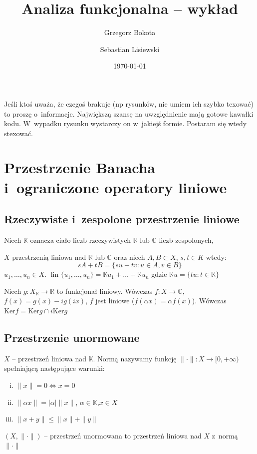 \documentclass[11pt]{mwrep}
\title{Analiza funkcjonalna  -- wykład}
\author{Grzegorz Bokota \and \normalsize  Sebastian Lisiewski}
\date{\today}
\renewcommand{\[}{\begin{equation}}
\renewcommand{\]}{\end{equation}}
\newcommand{\C}{{\ensuremath{\mathbb C}}}
\newcommand{\R}{{\ensuremath{\mathbb R}}}
\newcommand{\K}{\ensuremath{\mathbb{K}}}
\newcommand{\lin}{\operatorname{lin}}
\newcounter{numer}
\begin{document}
\setlength{\headheight}{15pt}
\pagestyle{fancy}
\maketitle
\tableofcontents
{}
Jeśli ktoś uważa, że czegoś brakuje (np rysunków, nie umiem ich szybko texować) to proszę o~informacje. 
Największą szansę na uwzględnienie mają gotowe kawałki kodu. W~wypadku rysunku wystarczy on w~jakiejś formie. Postaram się wtedy stexować.
\chapter{Przestrzenie Banacha i~ograniczone operatory liniowe}
\section{Rzeczywiste i~zespolone przestrzenie liniowe}
Niech $\K$ oznacza ciało liczb rzeczywistych $\R$ lub $\C$ liczb zespolonych,\par
$X$ przestrzenią liniowa nad $\R$ lub $\C$ oraz niech $A,B \subset  X$, $s,t \in K$ wtedy:
$$sA+tB = \{su + tv: u \in A, v\in B\}$$
$u_1,\ldots ,u_n \in X $. $\lin\{u_1,\ldots, u_n\} = \K u_1 + \ldots + \K u_n $ gdzie $\K u = \{ t u: t \in \K\} $ 

Niech $g: X_\R \to \R $ to funkcjonał liniowy. Wówczas $f: X \to \C$, $f(x) =g(x) - ig(ix)$, $f$ jest liniowe ($f(\alpha x) = \alpha f(x)$). 
Wówczas $\textrm{Ker}f = \textrm{Ker} g \cap i \textrm{Ker}g$

\section{Przestrzenie unormowane}
$X$ -- przestrzeń liniowa nad $\K$. Normą nazywamy funkcję  $\|\cdot \| : X \to [0, +\infty )$ spełniającą następujące warunki:
	\begin{enumerate}[i.]
	\item $\|x\| = 0 \Leftrightarrow x=0$ 
	\item $\|\alpha x \| = |\alpha| \| x\|$, $\alpha \in \K$,$x\in X$ 
	\item $\|x+y\| \le \|x\| + \|y\|$  
\end{enumerate}
$(X,\|\cdot\|)$ -- przestrzeń unormowana to przestrzeń liniowa nad $X$ z~normą $\|\cdot\|$\\
\end{document}
